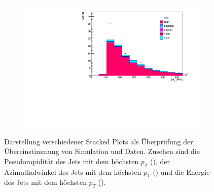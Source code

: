\begin{figure}
\begin{subfigure}{0.5\textwidth}
    \includegraphics[width=\linewidth]{plots_and_txt/stacked_plots/stacked_jet_E.pdf}
    \caption{}
    \label{fig:stacked_jet_pt_good4}
  \end{subfigure}%
  \caption{Darstellung verschiedener Stacked Plots als Überprüfung der Übereinstimmung von Simulation und Daten.
  Zusehen sind die Pseudorapidität des Jets mit dem höchsten $p_T$ (),  
  der Azimuthalwinkel des Jets mit dem höchsten $p_T$ () und die Energie des Jets mit dem höchsten $p_T$ ().
  }
  \label{fig:stacked_Distributions4}
\end{figure}

